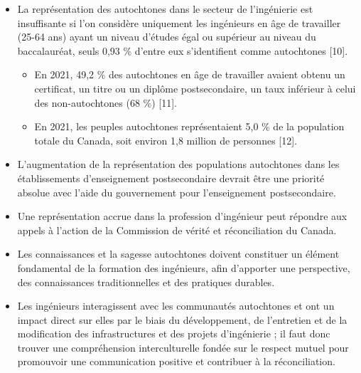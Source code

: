 \begin{itemize}
 \item La représentation des autochtones dans le secteur de l'ingénierie est insuffisante si l'on considère uniquement les ingénieurs en âge de travailler (25-64 ans) ayant un niveau d'études égal ou supérieur au niveau du baccalauréat, seuls 0,93 \% d'entre eux s'identifient comme autochtones [10].
 \begin{itemize}
  \item En 2021, 49,2 \% des autochtones en âge de travailler avaient obtenu un certificat, un titre ou un diplôme postsecondaire, un taux inférieur à celui des non-autochtones (68 \%) [11].
  \item En 2021, les peuples autochtones représentaient 5,0 \% de la population totale du Canada, soit environ 1,8 million de personnes [12].
 \end{itemize}
 \item L'augmentation de la représentation des populations autochtones dans les établissements d'enseignement postsecondaire devrait être une priorité absolue avec l'aide du gouvernement pour l'enseignement postsecondaire.
 \item Une représentation accrue dans la profession d'ingénieur peut répondre aux appels à l'action de la Commission de vérité et réconciliation du Canada.
 \item Les connaissances et la sagesse autochtones doivent constituer un élément fondamental de la formation des ingénieurs, afin d'apporter une perspective, des connaissances traditionnelles et des pratiques durables.
 \item Les ingénieurs interagissent avec les communautés autochtones et ont un impact direct sur elles par le biais du développement, de l'entretien et de la modification des infrastructures et des projets d'ingénierie ; il faut donc trouver une compréhension interculturelle fondée sur le respect mutuel pour promouvoir une communication positive et contribuer à la réconciliation.
\end{itemize}

